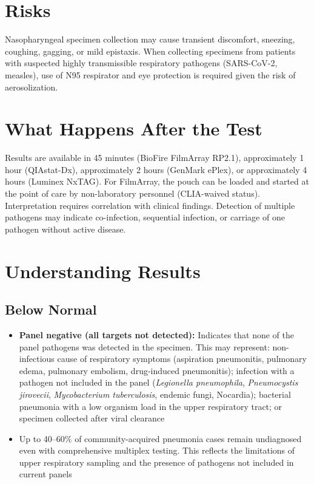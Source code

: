 \section*{Risks}
Nasopharyngeal specimen collection may cause transient discomfort, sneezing, coughing, gagging, or mild epistaxis. When collecting specimens from patients with suspected highly transmissible respiratory pathogens (SARS-CoV-2, measles), use of N95 respirator and eye protection is required given the risk of aerosolization.

\section*{What Happens After the Test}
Results are available in 45 minutes (BioFire FilmArray RP2.1), approximately 1 hour (QIAstat-Dx), approximately 2 hours (GenMark ePlex), or approximately 4 hours (Luminex NxTAG). For FilmArray, the pouch can be loaded and started at the point of care by non-laboratory personnel (CLIA-waived status). Interpretation requires correlation with clinical findings. Detection of multiple pathogens may indicate co-infection, sequential infection, or carriage of one pathogen without active disease.

\section*{Understanding Results}

\subsection*{Below Normal}
\begin{itemize}
  \item \textbf{Panel negative (all targets not detected):} Indicates that none of the panel pathogens was detected in the specimen. This may represent: non-infectious cause of respiratory symptoms (aspiration pneumonitis, pulmonary edema, pulmonary embolism, drug-induced pneumonitis); infection with a pathogen not included in the panel (\textit{Legionella pneumophila}, \textit{Pneumocystis jirovecii}, \textit{Mycobacterium tuberculosis}, endemic fungi, Nocardia); bacterial pneumonia with a low organism load in the upper respiratory tract; or specimen collected after viral clearance
  \item Up to 40--60\% of community-acquired pneumonia cases remain undiagnosed even with comprehensive multiplex testing. This reflects the limitations of upper respiratory sampling and the presence of pathogens not included in current panels
\end{itemize}

